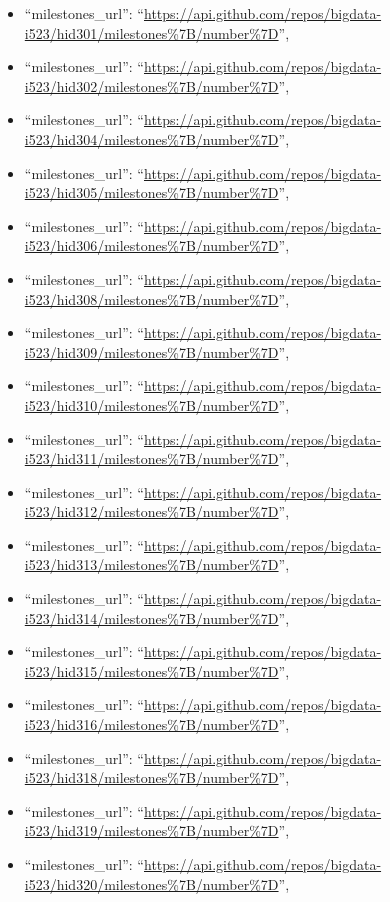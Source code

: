 \begin{itemize}
\item
  ``milestones\_url'':
  ``\url{https://api.github.com/repos/bigdata-i523/hid301/milestones\%7B/number\%7D}'',
\item
  ``milestones\_url'':
  ``\url{https://api.github.com/repos/bigdata-i523/hid302/milestones\%7B/number\%7D}'',
\item
  ``milestones\_url'':
  ``\url{https://api.github.com/repos/bigdata-i523/hid304/milestones\%7B/number\%7D}'',
\item
  ``milestones\_url'':
  ``\url{https://api.github.com/repos/bigdata-i523/hid305/milestones\%7B/number\%7D}'',
\item
  ``milestones\_url'':
  ``\url{https://api.github.com/repos/bigdata-i523/hid306/milestones\%7B/number\%7D}'',
\item
  ``milestones\_url'':
  ``\url{https://api.github.com/repos/bigdata-i523/hid308/milestones\%7B/number\%7D}'',
\item
  ``milestones\_url'':
  ``\url{https://api.github.com/repos/bigdata-i523/hid309/milestones\%7B/number\%7D}'',
\item
  ``milestones\_url'':
  ``\url{https://api.github.com/repos/bigdata-i523/hid310/milestones\%7B/number\%7D}'',
\item
  ``milestones\_url'':
  ``\url{https://api.github.com/repos/bigdata-i523/hid311/milestones\%7B/number\%7D}'',
\item
  ``milestones\_url'':
  ``\url{https://api.github.com/repos/bigdata-i523/hid312/milestones\%7B/number\%7D}'',
\item
  ``milestones\_url'':
  ``\url{https://api.github.com/repos/bigdata-i523/hid313/milestones\%7B/number\%7D}'',
\item
  ``milestones\_url'':
  ``\url{https://api.github.com/repos/bigdata-i523/hid314/milestones\%7B/number\%7D}'',
\item
  ``milestones\_url'':
  ``\url{https://api.github.com/repos/bigdata-i523/hid315/milestones\%7B/number\%7D}'',
\item
  ``milestones\_url'':
  ``\url{https://api.github.com/repos/bigdata-i523/hid316/milestones\%7B/number\%7D}'',
\item
  ``milestones\_url'':
  ``\url{https://api.github.com/repos/bigdata-i523/hid318/milestones\%7B/number\%7D}'',
\item
  ``milestones\_url'':
  ``\url{https://api.github.com/repos/bigdata-i523/hid319/milestones\%7B/number\%7D}'',
\item
  ``milestones\_url'':
  ``\url{https://api.github.com/repos/bigdata-i523/hid320/milestones\%7B/number\%7D}'',

\end{itemize}
